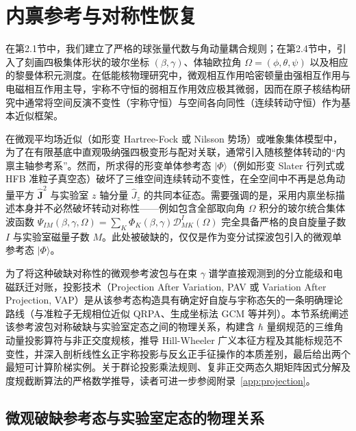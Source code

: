 \section{内禀参考与对称性恢复}\label{sec:2-5}

在第2.1节中，我们建立了严格的球张量代数与角动量耦合规则；在第2.4节中，引入了刻画四极集体形状的玻尔坐标 $(\beta, \gamma)$、体轴欧拉角 $\Omega = (\phi, \theta, \psi)$ 以及相应的黎曼体积元测度。在低能核物理研究中，微观相互作用哈密顿量由强相互作用与电磁相互作用主导，宇称不守恒的弱相互作用效应极其微弱，因而在原子核结构研究中通常将空间反演不变性（宇称守恒）与空间各向同性（连续转动守恒）作为基本近似框架。

在微观平均场近似（如形变 Hartree-Fock 或 Nilsson 势场）或唯象集体模型中，为了在有限基底中直观吸纳强四极变形与配对关联，通常引入随核整体转动的“内禀主轴参考系”。然而，所求得的形变单体参考态 $|\Phi\rangle$（例如形变 Slater 行列式或 HFB 准粒子真空态）破坏了三维空间连续转动不变性，在全空间中不再是总角动量平方 $\hat{\mathbf{J}}^2$ 与实验室 $z$ 轴分量 $\hat{J}_z$ 的共同本征态。需要强调的是，采用内禀坐标描述本身并不必然破坏转动对称性——例如包含全部取向角 $\Omega$ 积分的玻尔统合集体波函数 $\Psi_{IM}(\beta, \gamma, \Omega) = \sum_K \Phi_K(\beta, \gamma) \mathcal{D}^I_{MK}(\Omega)$ 完全具备严格的良自旋量子数 $I$ 与实验室磁量子数 $M$。此处被破缺的，仅仅是作为变分试探波包引入的微观单参考态 $|\Phi\rangle$。

为了将这种破缺对称性的微观参考波包与在束 $\gamma$ 谱学直接观测到的分立能级和电磁跃迁对账，投影技术（Projection After Variation, PAV 或 Variation After Projection, VAP）是从该参考态构造具有确定好自旋与宇称态矢的一条明确理论路线（与准粒子无规相位近似 QRPA、生成坐标法 GCM 等并列）。本节系统阐述该参考波包对称破缺与实验室定态之间的物理关系，构建含 $\hbar$ 量纲规范的三维角动量投影算符与非正交度规核，推导 Hill-Wheeler 广义本征方程及其能标规范不变性，并深入剖析线性幺正宇称投影与反幺正手征操作的本质差别，最后给出两个最短可计算阶梯实例。关于群论投影乘法规则、复非正交两态久期矩阵因式分解及度规截断算法的严格数学推导，读者可进一步参阅附录~\ref{app:projection}。

\subsection{微观破缺参考态与实验室定态的物理关系}\label{sec:2-5-1}

